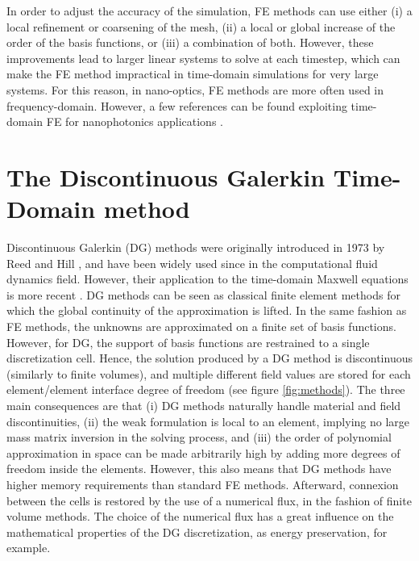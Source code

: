 In order to adjust the accuracy of the simulation, FE methods can use either (i) a local refinement or coarsening of the mesh, (ii) a local or global increase of the order of the basis functions, or (iii) a combination of both. However, these improvements lead to larger linear systems to solve at each timestep, which can make the FE method impractical in time-domain simulations for very large systems. For this reason, in nano-optics, FE methods are more often used in frequency-domain. However, a few references can be found exploiting time-domain FE for nanophotonics applications \cite{Huang1}.

\section{The Discontinuous Galerkin Time-Domain method}

Discontinuous Galerkin (DG) methods were originally introduced in 1973 by Reed and Hill \cite{Reed1}, and have been widely used since in the computational fluid dynamics field. However, their application to the time-domain Maxwell equations is more recent \cite{Remaki1}. DG methods can be seen as classical finite element methods for which the global continuity of the approximation is lifted. In the same fashion as FE methods, the unknowns are approximated on a finite set of basis functions. However, for DG, the support of basis functions are restrained to a single discretization cell. Hence, the solution produced by a DG method is discontinuous (similarly to finite volumes), and multiple different field values are stored for each element/element interface degree of freedom (see figure \ref{fig:methods}). The three main consequences are that (i) DG methods naturally handle material and field discontinuities, (ii) the weak formulation is local to an element, implying no large mass matrix inversion in the solving process, and (iii) the order of polynomial approximation in space can be made arbitrarily high by adding more degrees of freedom inside the elements. However, this also means that DG methods have higher memory requirements than standard FE methods. Afterward, connexion between the cells is restored by the use of a numerical flux, in the fashion of finite volume methods. The choice of the numerical flux has a great influence on the mathematical properties of the DG discretization, as energy preservation, for example. 

